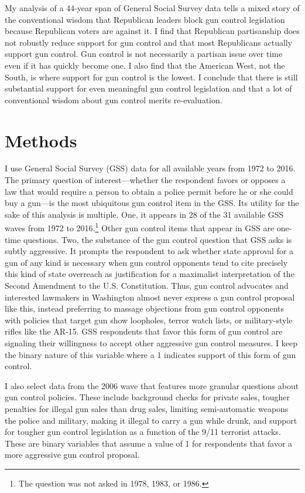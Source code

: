 \documentclass[11pt,]{article}
\begin{document}
My analysis of a 44-year span of General Social Survey data tells a
mixed story of the conventional wisdom that Republican leaders block gun
control legislation because Republican voters are against it. I find
that Republican partisanship does not robustly reduce support for gun
control and that most Republicans actually support gun control. Gun
control is not necessarily a partisan issue over time even if it has
quickly become one. I also find that the American West, not the South,
is where support for gun control is the lowest. I conclude that there is
still substantial support for even meaningful gun control legislation
and that a lot of conventional wisdom about gun control merits
re-evaluation.

\section{Methods}\label{methods}

I use General Social Survey (GSS) data for all available years from 1972
to 2016. The primary question of interest---whether the respondent
favors or opposes a law that would require a person to obtain a police
permit before he or she could buy a gun---is the most ubiquitous gun
control item in the GSS. Its utility for the sake of this analysis is
multiple. One, it appears in 28 of the 31 available GSS waves from 1972
to 2016.\footnote{The question was not asked in 1978, 1983, or 1986.}
Other gun control items that appear in GSS are one-time questions. Two,
the substance of the gun control question that GSS asks is subtly
aggressive. It prompts the respondent to ask whether state approval for
a gun of any kind is necessary when gun control opponents tend to cite
precisely this kind of state overreach as justification for a maximalist
interpretation of the Second Amendment to the U.S. Constitution. Thus,
gun control advocates and interested lawmakers in Washington almost
never express a gun control proposal like this, instead preferring to
massage objections from gun control opponents with policies that target
gun show loopholes, terror watch lists, or military-style rifles like
the AR-15. GSS respondents that favor this form of gun control are
signaling their willingness to accept other aggressive gun control
measures. I keep the binary nature of this variable where a 1 indicates
support of this form of gun control.

I also select data from the 2006 wave that features more granular
questions about gun control policies. These include background checks
for private sales, tougher penalties for illegal gun sales than drug
sales, limiting semi-automatic weapons the police and military, making
it illegal to carry a gun while drunk, and support for tougher gun
control legislation as a function of the 9/11 terrorist attacks. These
are binary variables that assume a value of 1 for respondents that favor
a more aggressive gun control proposal.
\end{document}
